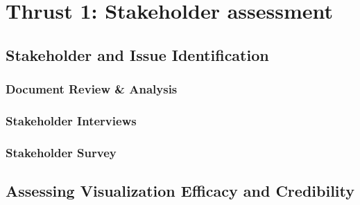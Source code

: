 \chapter{Thrust 1: Stakeholder assessment}\label{chap:thrust1}

\section{Stakeholder and Issue Identification}

\subsection{Document Review \& Analysis}

\subsection{Stakeholder Interviews}

\subsection{Stakeholder Survey}

\section{Assessing Visualization Efficacy and Credibility} %


